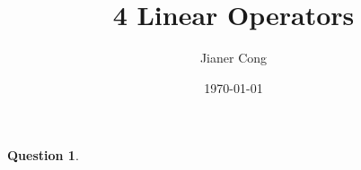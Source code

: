 \documentclass{article}
\title{4 Linear Operators}
\author{Jianer Cong}
\date{\today}
\theoremstyle{definition}
\newtheorem{qst}{Question}[section]
\begin{document}
\maketitle
\begin{qst}

\end{qst}
\end{document}
